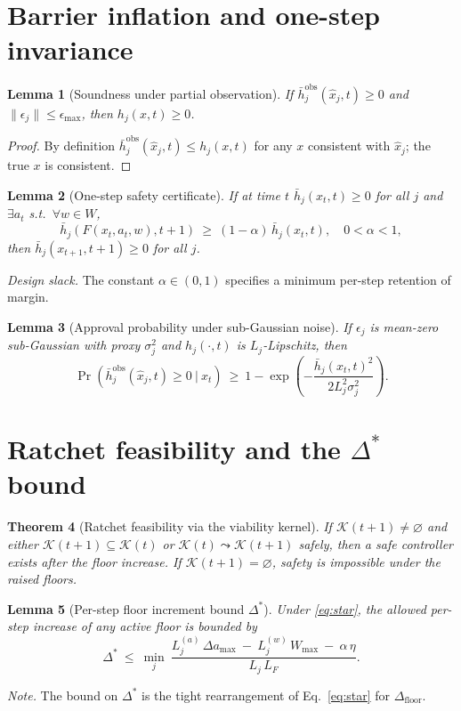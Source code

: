 \documentclass[11pt]{article}
\newtheorem{theorem}{Theorem}[section]
\newtheorem{lemma}[theorem]{Lemma}
\theoremstyle{definition}
\newcommand{\K}{\mathcal{K}}
\begin{document}
\section{Barrier inflation and one-step invariance}
\begin{lemma}[Soundness under partial observation]\label{lem:sound}
If $\bar h^{\mathrm{obs}}_j(\hat x_j,t)\ge 0$ and $\|\epsilon_j\|\le \epsilon_{\max}$, then $h_j(x,t)\ge 0$.
\end{lemma}
\begin{proof}
By definition $\bar h^{\mathrm{obs}}_j(\hat x_j,t)\le h_j(x,t)$ for any $x$ consistent with $\hat x_j$; the true $x$ is consistent.
\end{proof}

\begin{lemma}[One-step safety certificate]\label{lem:oneStep}
If at time $t$ $\bar h_j(x_t,t)\ge 0$ for all $j$ and $\exists a_t$ s.t.\ $\forall w\in W$,
\[
\bar h_j(F(x_t,a_t,w),t{+}1)\ \ge\ (1-\alpha)\,\bar h_j(x_t,t),\quad 0<\alpha<1,
\]
then $\bar h_j(x_{t+1},t{+}1)\ge 0$ for all $j$.
\end{lemma}
\noindent\textit{Design slack.} The constant $\alpha\in(0,1)$ specifies a minimum per-step retention of margin.

\begin{lemma}[Approval probability under sub-Gaussian noise]\label{lem:concentration}
If $\epsilon_j$ is mean-zero sub-Gaussian with proxy $\sigma_j^2$ and $h_j(\cdot,t)$ is $L_j$-Lipschitz, then
\[
\Pr\!\left(\bar h^{\mathrm{obs}}_j(\hat x_j,t)\ge 0\ \big|\ x_t\right)\ \ge\ 1-\exp\!\left(-\frac{\bar h_j(x_t,t)^2}{2L_j^2\sigma_j^2}\right).
\]
\end{lemma}

\section{Ratchet feasibility and the $\Delta^\ast$ bound}
\begin{theorem}[Ratchet feasibility via the viability kernel]\label{thm:kernelRatchet}
If $\K(t+1)\neq\varnothing$ and either $\K(t+1)\subseteq\K(t)$ or $\K(t)\leadsto \K(t+1)$ safely, then a safe controller exists after the floor increase. If $\K(t+1)=\varnothing$, safety is impossible under the raised floors.
\end{theorem}

\begin{lemma}[Per-step floor increment bound $\Delta^\ast$]\label{lem:delta}
Under \cref{eq:star}, the allowed per-step increase of any active floor is bounded by
\[
\Delta^\ast\ \le\ \min_{j}\ \frac{L^{(a)}_j\,\Delta a_{\max}\ -\ L^{(w)}_j\,W_{\max}\ -\ \alpha\,\eta}{L_j\,L_F}.
\]
\end{lemma}
\noindent\textit{Note.} The bound on $\Delta^\ast$ is the tight rearrangement of Eq.~\eqref{eq:star} for $\Delta_{\mathrm{floor}}$.
\end{document}
